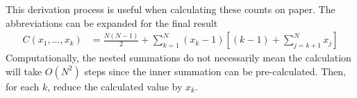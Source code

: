 \documentclass[12pt]{article}
\begin{document}
This derivation process is useful when calculating these counts on paper.
The abbreviations can be expanded for the final result
\begin{equation}
\begin{aligned}
    C(x_1,...,x_k) &= \frac{N(N-1)}{2} + \sum_{k=1}^{N} (x_k - 1) \left[ (k-1) + \sum_{j=k+1}^{N} x_j \right]
\end{aligned}
\end{equation}
Computationally, the nested summations do not necessarily mean the calculation
will take $O(N^2)$ steps since the inner summation can be pre-calculated. Then,
for each $k$, reduce the calculated value by $x_k$.
\end{document}
